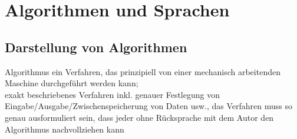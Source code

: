 \section{%
    Algorithmen und Sprachen%
}

\subsection{%
    Darstellung von Algorithmen%
}

\begin{Def}{Algorithmus}
    ein Verfahren, das prinzipiell von einer mechanisch arbeitenden
    Maschine durchgeführt werden kann; \\
    exakt beschriebenes Verfahren inkl. genauer Festlegung von
    Eingabe/Ausgabe/Zwischen\-spei\-cherung von Daten usw., das Verfahren
    muss so genau ausformuliert sein, dass jeder ohne Rücksprache mit dem
    Autor den Algorithmus nachvollziehen kann
\end{Def}

